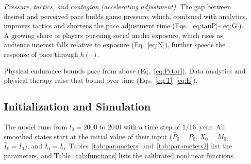 \textit{Pressure, tactics, and contagion (accelerating adjustment).}
The gap between desired and perceived pace builds game pressure, which,
combined with analytics, improves tactics and shortens the pace
adjustment time (Eqs.~\ref{eq:tauP}--\ref{eq:G}). A growing share of
players pursuing social media exposure, which rises as audience
interest falls relative to exposure (Eq.~\ref{eq:N}), further speeds
the response of pace through $h(\cdot)$.

Physical endurance bounds pace from above (Eq.~\ref{eq:Pstar}). Data
analytics and physical therapy raise that bound over time
(Eqs.~\ref{eq:T}--\ref{eq:E}).

\subsection{Initialization and Simulation}
\label{sec:model:simulation}

The model runs from $t_0 = 2000$ to $2040$ with a time step of
$1/16$~year. All smoothed states start at the initial value of their
input ($\hat{P}_0 = P_0$, $X_0 = M_0$, $\hat{I}_0 = I_0$), and
$\bar{I}_0 = I_0$. Tables~\ref{tab:parameters} and~\ref{tab:parameters2}
list the parameters, and Table~\ref{tab:functions} lists the calibrated
nonlinear functions.


